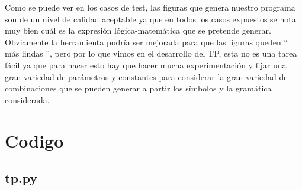 \documentclass[a4paper, 10pt, twoside]{article}
\begin{document}
Como se puede ver en los casos de test, las figuras que genera nuestro programa son de un nivel de calidad aceptable ya que en todos los casos expuestos se nota muy bien cuál es la expresión lógica-matemática que se pretende generar. Obviamente la herramienta podría ser mejorada para que las figuras queden `` más lindas '', pero por lo que vimos en el desarrollo del TP, esta no es una tarea fácil ya que para hacer esto hay que hacer mucha experimentación y fijar una gran variedad de parámetros y constantes para considerar la gran variedad de combinaciones que se pueden generar a partir los símbolos y la gramática considerada.


\section{Codigo}


\subsection{tp.py}

\end{document}
